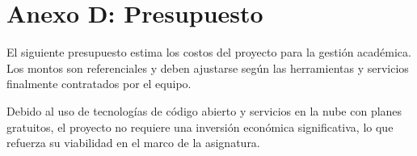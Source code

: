 
\section{Anexo D: Presupuesto}

El siguiente presupuesto estima los costos del proyecto para la gesti\'on
acad\'emica. Los montos son referenciales y deben ajustarse seg\'un las
herramientas y servicios finalmente contratados por el equipo.

\begin{table}[H]
  \centering
  \caption{Presupuesto estimado del proyecto (en bolivianos, Bs)}
\end{table}

Debido al uso de tecnolog\'ias de c\'odigo abierto y servicios en la nube con
planes gratuitos, el proyecto no requiere una inversi\'on econ\'omica
significativa, lo que refuerza su viabilidad en el marco de la asignatura.
